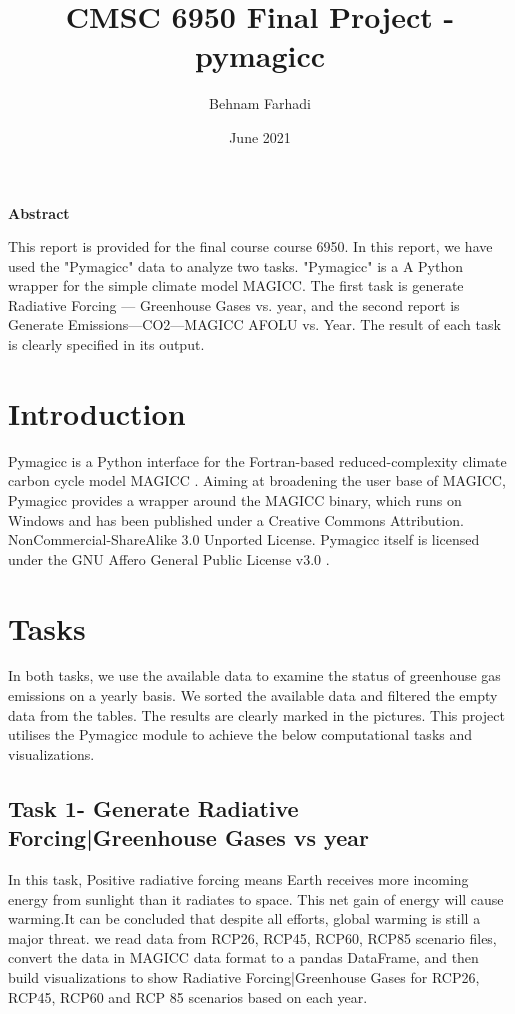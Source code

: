 \documentclass{article}
\title{CMSC 6950 Final Project - pymagicc}
\author{Behnam Farhadi}
\date{June 2021}
\begin{document}
\maketitle

\textbf{Abstract}

This report is provided for the final course course 6950. In this report, we have used the "Pymagicc" data to analyze two tasks. "Pymagicc" is a A Python wrapper for the simple climate model MAGICC. The first task is generate Radiative Forcing — Greenhouse Gases vs. year, and the second report is Generate Emissions—CO2—MAGICC AFOLU vs. Year. The result of each task is clearly specified in its output.

\vspace{1cm}
\section{Introduction}
Pymagicc is a Python interface for the Fortran-based reduced-complexity climate carbon cycle model MAGICC \cite{1}. Aiming at broadening the user base of MAGICC, Pymagicc provides a wrapper around the MAGICC binary, which runs on Windows and has been published under a Creative Commons Attribution. NonCommercial-ShareAlike 3.0 Unported License. Pymagicc itself is licensed under the GNU Affero General Public License v3.0 \cite{2}.
\vspace{1cm}
\section{Tasks}
In both tasks, we use the available data to examine the status of greenhouse gas emissions on a yearly basis. We sorted the available data and filtered the empty data from the tables. The results are clearly marked in the pictures. This project utilises the Pymagicc module to achieve the below computational tasks and visualizations.
\vspace{5cm} 
\subsection{ Task 1- Generate Radiative Forcing|Greenhouse Gases vs year}
In this task, Positive radiative forcing means Earth receives more incoming energy from sunlight than it radiates to space. This net gain of energy will cause warming.It can be concluded that despite all efforts, global warming is still a major threat. we read data from RCP26, RCP45, RCP60, RCP85 scenario files, convert the data in MAGICC data format to a pandas DataFrame, and then build visualizations to show Radiative Forcing|Greenhouse Gases for RCP26, RCP45, RCP60 and RCP 85 scenarios based on each year. 
\end{document}
